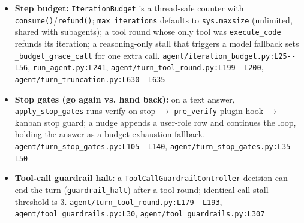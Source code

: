 \begin{itemize}
\item \textbf{Step budget:} \texttt{IterationBudget} is a thread-safe counter with \texttt{consume(\allowbreak{})}/\texttt{refund(\allowbreak{})}; \texttt{max\_\allowbreak{}iterations} defaults to \texttt{sys.\allowbreak{}maxsize} (unlimited, shared with subagents); a tool round whose only tool was \texttt{execute\_\allowbreak{}code} refunds its iteration; a reasoning-only stall that triggers a model fallback sets \texttt{\_\allowbreak{}budget\_\allowbreak{}grace\_\allowbreak{}call} for one extra call. \texttt{agent/\allowbreak{}iteration\_\allowbreak{}budget.\allowbreak{}py:\allowbreak{}L25-\allowbreak{}-\allowbreak{}L56}, \texttt{run\_\allowbreak{}agent.\allowbreak{}py:\allowbreak{}L241}, \texttt{agent/\allowbreak{}turn\_\allowbreak{}tool\_\allowbreak{}round.\allowbreak{}py:\allowbreak{}L199-\allowbreak{}-\allowbreak{}L200}, \texttt{agent/\allowbreak{}turn\_\allowbreak{}truncation.\allowbreak{}py:\allowbreak{}L630-\allowbreak{}-\allowbreak{}L635}
\item \textbf{Stop gates (go again vs. hand back):} on a text answer, \texttt{apply\_\allowbreak{}stop\_\allowbreak{}gates} runs verify-on-stop $\rightarrow$ \texttt{pre\_\allowbreak{}verify} plugin hook $\rightarrow$ kanban stop guard; a nudge appends a user-role row and continues the loop, holding the answer as a budget-exhaustion fallback. \texttt{agent/\allowbreak{}turn\_\allowbreak{}stop\_\allowbreak{}gates.\allowbreak{}py:\allowbreak{}L105-\allowbreak{}-\allowbreak{}L140}, \texttt{agent/\allowbreak{}turn\_\allowbreak{}stop\_\allowbreak{}gates.\allowbreak{}py:\allowbreak{}L35-\allowbreak{}-\allowbreak{}L50}
\item \textbf{Tool-call guardrail halt:} a \texttt{ToolCallGuardrailController} decision can end the turn (\texttt{guardrail\_\allowbreak{}halt}) after a tool round; identical-call stall threshold is 3. \texttt{agent/\allowbreak{}turn\_\allowbreak{}tool\_\allowbreak{}round.\allowbreak{}py:\allowbreak{}L179-\allowbreak{}-\allowbreak{}L193}, \texttt{agent/\allowbreak{}tool\_\allowbreak{}guardrails.\allowbreak{}py:\allowbreak{}L30}, \texttt{agent/\allowbreak{}tool\_\allowbreak{}guardrails.\allowbreak{}py:\allowbreak{}L307}

\end{itemize}

